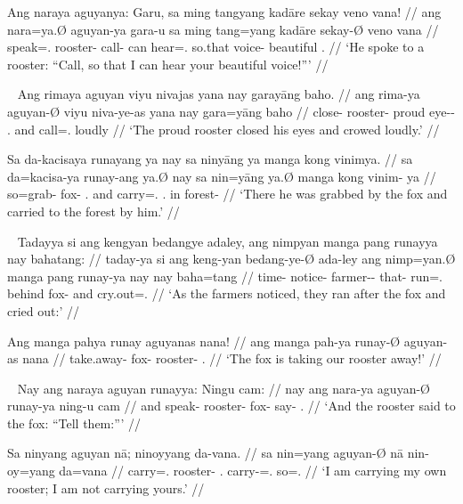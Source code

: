 \a\begingl
	\gla Ang naraya aguyanya: Garu, sa ming tangyang kadāre sekay veno vana! //
	\glb ang nara=ya.Ø aguyan-ya gara-u sa ming tang=yang kadāre sekay-Ø veno
		vana //
	\glc \AgtT{} speak=\TsgM{}.\Top{} rooster-\Loc{} call-\Imp{} \PatT{} can
		hear=\Fsg{}.\Aarg{} so.that voice-\Top{} beautiful \Second{}.\Gen{} //
	\glft `He spoke to a rooster: \enquote{Call, so that I can hear
		your beautiful voice!}' //
\endgl

\xe

\pex~ %
\a\begingl
	\gla Ang rimaya aguyan viyu nivajas yana nay garayāng baho. //
	\glb ang rima-ya aguyan-Ø viyu niva-ye-as yana nay gara=yāng baho //
	\glc \AgtT{} close-\TsgM{} rooster-\Top{} proud eye-\Pl{}-\Parg{}
		\TsgM{}.\Gen{} and call=\TsgM{}.\Aarg{} loudly //
	\glft `The proud rooster closed his eyes and crowed loudly.' //
\endgl

\a\begingl
	\gla Sa da-kacisaya runayang ya nay sa ninyāng ya manga kong vinimya. //
	\glb sa da=kacisa-ya runay-ang ya.Ø nay sa nin=yāng ya.Ø manga kong vinim-
		ya //
	\glc \PatT{} so=grab-\TsgM{} fox-\Aarg{} \TsgM{}.\Top{} and \PatT{}
		carry=\TsgM{}.\Aarg{} \TsgM{}.\Top{} \Dyn{} in forest-\Loc{} //
	\glft `There he was grabbed by the fox and carried to the forest by him.' //
\endgl

\xe

\pex~ %
\a\begingl
	\gla Tadayya si ang kengyan bedangye adaley, ang nimpyan manga pang runayya
		nay bahatang: //
	\glb taday-ya si ang keng-yan bedang-ye-Ø ada-ley ang nimp=yan.Ø manga pang
		runay-ya nay nay baha=tang //
	\glc time-\Loc{} \Rel{} \AgtT{} notice-\TplM{} farmer-\Pl{}-\Top{}
		that-\PargI{} \AgtT{} run=\TplM{}.\Top{} \Dyn{} behind fox-\Loc{} and
		cry.out=\TplM{}.\Aarg{} //
	\glft `As the farmers noticed, they ran after the fox and cried out:' //
\endgl

\a\begingl
	\gla Ang manga pahya runay aguyanas nana! //
	\glb ang manga pah-ya runay-Ø aguyan-as nana //
	\glc \AgtT{} \Prog{} take.away-\TsgM{} fox-\Top{} rooster-\Parg{}
		\Fsg{}.\Gen{} //
	\glft `The fox is taking our rooster away!' //
\endgl

\xe

\pex~ %
\a\begingl
	\gla Nay ang naraya aguyan runayya: Ningu cam: //
	\glb nay ang nara-ya aguyan-Ø runay-ya ning-u cam //
	\glc and \AgtT{} speak-\TsgM{} rooster-\Top{} fox-\Loc{} say-\Imp{}
		\TplM{}.\Dat{} //
	\glft `And the rooster said to the fox: \enquote{Tell them:}' //
\endgl

\a\label{ex:negativbindung}\begingl
	\gla Sa ninyang aguyan nā; ninoyyang da-vana. //
	\glb sa nin=yang aguyan-Ø nā nin-oy=yang da=vana //
	\glc \PatT{} carry=\Fsg{}.\Aarg{} rooster-\Top{} \Fsg{}.\Gen{}
		carry-\Neg{}=\Fsg{}.\Aarg{} so=\Spl{}.\Gen{} //
	\glft `I am carrying my own rooster; I am not carrying yours.' //
\endgl

